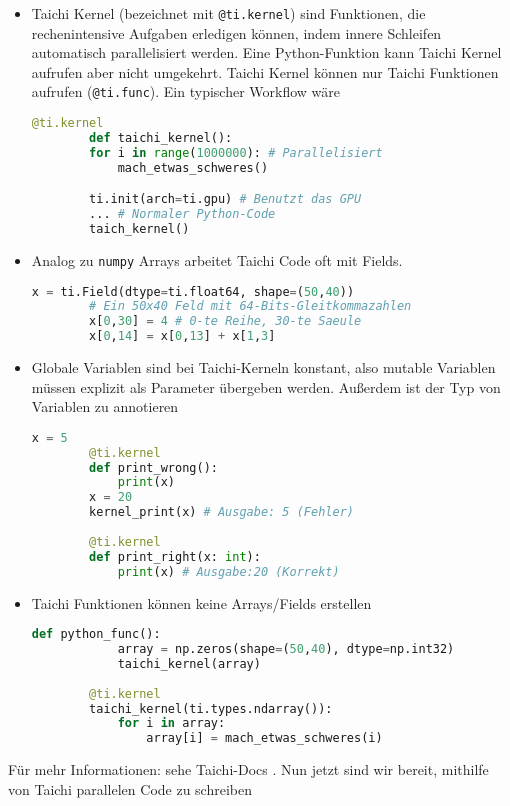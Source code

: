 \documentclass{article}
\begin{document}
\begin{itemize}
	\item Taichi Kernel (bezeichnet mit \lstinline|@ti.kernel|) sind Funktionen, die rechenintensive Aufgaben erledigen können, indem innere Schleifen automatisch parallelisiert werden. Eine Python-Funktion kann Taichi Kernel aufrufen aber nicht umgekehrt. Taichi Kernel können nur Taichi Funktionen aufrufen (\lstinline|@ti.func|). Ein typischer Workflow wäre
	\begin{lstlisting}[language=python]
		@ti.kernel
		def taichi_kernel():
		for i in range(1000000): # Parallelisiert
			mach_etwas_schweres()

		ti.init(arch=ti.gpu) # Benutzt das GPU 
		... # Normaler Python-Code
		taich_kernel() 
	\end{lstlisting}

	\item Analog zu \lstinline|numpy| Arrays arbeitet Taichi Code oft mit Fields.	
	\begin{lstlisting}[language=python]
		x = ti.Field(dtype=ti.float64, shape=(50,40))
		# Ein 50x40 Feld mit 64-Bits-Gleitkommazahlen
		x[0,30] = 4 # 0-te Reihe, 30-te Saeule
		x[0,14] = x[0,13] + x[1,3]
	\end{lstlisting}
	
	\item Globale Variablen sind bei Taichi-Kerneln konstant, also mutable Variablen müssen explizit als Parameter übergeben werden. Außerdem ist der Typ von Variablen zu annotieren
		\begin{lstlisting}[language=python]
		x = 5
		@ti.kernel
		def print_wrong():
			print(x)
		x = 20
		kernel_print(x) # Ausgabe: 5 (Fehler)
		
		@ti.kernel
		def print_right(x: int):
			print(x) # Ausgabe:20 (Korrekt)
	\end{lstlisting}
	
	\item Taichi Funktionen können keine Arrays/Fields erstellen
		\begin{lstlisting}[language=python]
		def python_func():
			array = np.zeros(shape=(50,40), dtype=np.int32)
			taichi_kernel(array)
		
		@ti.kernel
		taichi_kernel(ti.types.ndarray()):
			for i in array:
				array[i] = mach_etwas_schweres(i)
	\end{lstlisting}
\end{itemize}
Für mehr Informationen: sehe Taichi-Docs \cite{taichi}. Nun jetzt sind wir bereit, mithilfe von Taichi parallelen Code zu schreiben
\end{document}
